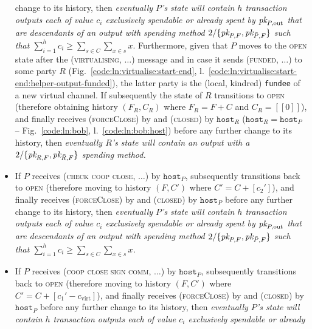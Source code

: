 \begin{itemize}
    change to its history, then \emph{eventually $P$'s \ledger state will
    contain $h$ transaction outputs each of value $c_i$ exclusively spendable or
    already spent by $\textit{pk}_{P, \mathrm{out}}$ that are descendants of an output
    with spending method $2/\{\textit{pk}_{P, F}, \textit{pk}_{\bar{P}, F}\}$ such that
    $\sum\limits_{i=1}^h c_i \geq \sum\limits_{s \in C} \sum\limits_{x \in s}
    x$}. Furthermore, given that $P$ moves to the \textsc{open} state after the
    (\textsc{virtualising}, $\dots$) message and in case it sends
    (\textsc{funded}, $\dots$) to some party $R$
    (Fig.~\ref{code:ln:virtualise:start-end},
    l.~\ref{code:ln:virtualise:start-end:helper-output-funded}), the latter
    party is the (local, kindred) \texttt{fundee} of a new virtual channel. If
    subsequently the state of $R$ transitions to \textsc{open} (therefore
    obtaining history $(F_R, C_R)$ where $F_R = F + C$ and $C_R = [[0]]$), and
    finally receives (\textsc{forceClose}) by \environment and (\textsc{closed}) by
    $\texttt{host}_R$ ($\texttt{host}_R = \texttt{host}_P$ --
    Fig.~\ref{code:ln:bob}, l.~\ref{code:ln:bob:host}) before any further change
    to its history, then \emph{eventually $R$'s \ledger state will contain an
    output with a $2/\{\textit{pk}_{R, F}, \textit{pk}_{\bar{R}, F}\}$ spending method.}
    \item If $P$ receives (\textsc{check coop close}, $\dots$) by
    $\texttt{host}_P$, subsequently transitions back to \textsc{open} (therefore
    moving to history $(F, C')$ where $C' = C + [c_2']$), and finally receives
    (\textsc{forceClose}) by \environment and (\textsc{closed}) by
    $\texttt{host}_P$ before any further change to its history, then
    \emph{eventually $P$'s \ledger state will contain $h$ transaction outputs
    each of value $c_i$ exclusively spendable or already spent by $\textit{pk}_{P,
    \mathrm{out}}$ that are descendants of an output with spending method
    $2/\{\textit{pk}_{P, F}, \textit{pk}_{\bar{P}, F}\}$ such that $\sum\limits_{i=1}^h c_i \geq
    \sum\limits_{s \in C} \sum\limits_{x \in s} x$.}
    \item If $P$ receives (\textsc{coop close sign comm}, $\dots$) by
    $\texttt{host}_P$, subsequently transitions back to \textsc{open} (therefore
    moving to history $(F, C')$ where $C' = C + [c_1' - c_{\mathrm{virt}}]$),
    and finally receives (\textsc{forceClose}) by \environment and
    (\textsc{closed}) by $\texttt{host}_P$ before any further change to its
    history, then \emph{eventually $P$'s \ledger state will contain $h$
    transaction outputs each of value $c_i$ exclusively spendable or already
}
\end{itemize}
